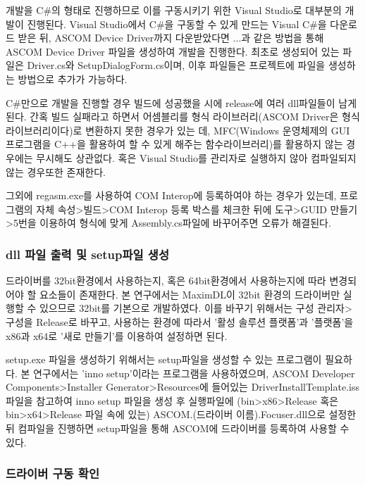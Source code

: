 개발을 C\#의 형태로 진행하므로 이를 구동시키기 위한 Visual Studio로 대부분의 개발이 진행된다. Visual Studio에서 C\#을 구동할 수 있게 만드는 Visual C\#을 다운로드 받은 뒤, ASCOM Device Driver까지 다운받았다면 ...과 같은 방법을 통해 ASCOM Device Driver 파일을 생성하여 개발을 진행한다. 최초로 생성되어 있는 파일은 Driver.cs와 SetupDialogForm.cs이며, 이후 파일들은 프로젝트에 파일을 생성하는 방법으로 추가가 가능하다.

C\#만으로 개발을 진행할 경우 빌드에 성공했을 시에 release에 여러 dll파일들이 남게 된다. 간혹 빌드 실패라고 하면서 어셈블리를 형식 라이브러리(ASCOM Driver은 형식 라이브러리이다)로 변환하지 못한 경우가 있는 데, MFC(Windows 운영체제의 GUI 프로그램을  C++을 활용하여 할 수 있게 해주는 함수라이브러리)를 활용하지 않는 경우에는 무시해도 상관없다. 혹은 Visual Studio를 관리자로 실행하지 않아 컴파일되지 않는 경우또한 존재한다.

그외에 regasm.exe를 사용하여 COM Interop에 등록하여야 하는 경우가 있는데, 프로그램의 자체 속성>빌드>COM Interop 등록 박스를 체크한 뒤에 도구>GUID 만들기>5번을 이용하여 형식에 맞게 Assembly.cs파일에 바꾸어주면 오류가 해결된다.

\subsubsection{dll 파일 출력 및 setup파일 생성}
드라이버를 32bit환경에서 사용하는지, 혹은 64bit환경에서 사용하는지에 따라 변경되어야 할 요소들이 존재한다. 본 연구에서는 MaximDL이 32bit 환경의 드라이버만 실행할 수 있으므로 32bit를 기본으로 개발하였다. 이를 바꾸기 위해서는 구성 관리자>구성을 Release로 바꾸고, 사용하는 환경에 따라서 '활성 솔루션 플랫폼'과 '플랫폼'을 x86과 x64로 '새로 만들기'를 이용하여 설정하면 된다.

setup.exe 파일을 생성하기 위해서는 setup파일을 생성할 수 있는 프로그램이 필요하다. 본 연구에서는 'inno setup'이라는 프로그램을 사용하였으며, ASCOM Developer Components>Installer Generator>Resources에 들어있는 DriverInstallTemplate.iss파일을 참고하여 inno setup 파일을 생성 후 실행파일에 (bin>x86>Release 혹은 bin>x64>Release 파일 속에 있는) ASCOM.(드라이버 이름).Focuser.dll으로 설정한 뒤 컴파일을 진행하면 setup파일을 통해 ASCOM에 드라이버를 등록하여 사용할 수 있다.

\subsubsection{드라이버 구동 확인}


